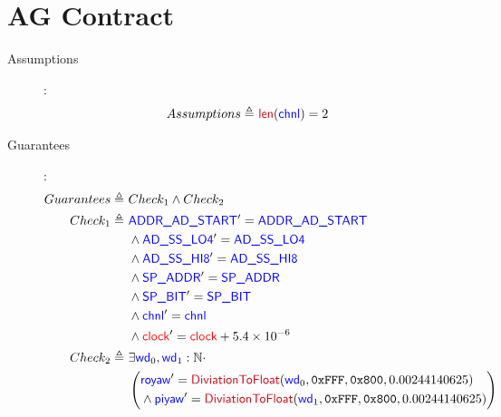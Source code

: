 \documentclass[fleqn,a4paper]{article}
\newcommand\Var[1]{\textcolor{blue}{\textsf{#1}}}
\newcommand\syntax[1]{\textcolor[RGB]{202,12,22}{\textsf{#1}}}
\newcommand\clock{\textcolor{red}{\textsf{clock}}}
\newcommand\definedby{\triangleq}
\begin{document}
\newpage

\section{AG Contract}

\begin{description}
\item[Assumptions]:
\begin{align*}
Assumptions \definedby \
& \syntax{len}(\Var{chnl}) = 2
\end{align*}

\item[Guarantees]:
\begin{align*}
Guarantees \definedby \
& Check_1 \wedge Check_2 \\
Check_1 \definedby \
& \Var{ADDR\_AD\_START}' = \Var{ADDR\_AD\_START} \\
& \wedge \Var{AD\_SS\_LO4}' = \Var{AD\_SS\_LO4} \\
& \wedge \Var{AD\_SS\_HI8}' = \Var{AD\_SS\_HI8} \\
& \wedge \Var{SP\_ADDR}' = \Var{SP\_ADDR} \\
& \wedge \Var{SP\_BIT}' = \Var{SP\_BIT} \\
& \wedge \Var{chnl}' = \Var{chnl} \\
& \wedge \clock' = \clock+5.4 \times 10^{-6} \\
Check_2 \definedby \
& \exists \Var{wd}_0,\Var{wd}_1 : \mathbb{N} \cdot \\
& \left(
\begin{aligned}
& \Var{royaw}' = \syntax{DiviationToFloat}(\Var{wd}_0, \texttt{0xFFF}, \texttt{0x800}, 0.00244140625) \\
& \wedge \Var{piyaw}' = \syntax{DiviationToFloat}(\Var{wd}_1, \texttt{0xFFF}, \texttt{0x800}, 0.00244140625) \\
\end{aligned}
\right)
\end{align*}

\end{description}
\end{document}
